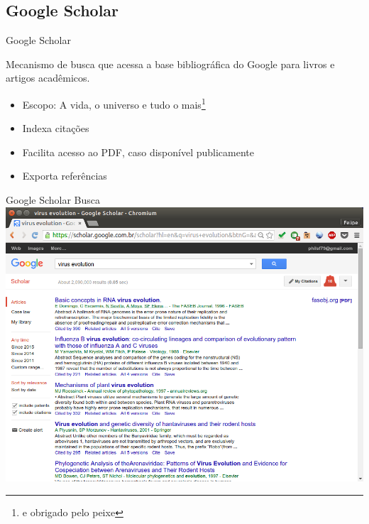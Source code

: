 \documentclass{beamer}
\begin{document}
\subsection{Google Scholar}

\begin{frame}{Google Scholar}
  \begin{definition}
    Mecanismo de busca que acessa a base bibliográfica do Google para
    livros e artigos acadêmicos.
  \end{definition}
  \begin{itemize}
  \item Escopo: A vida, o universo e tudo o mais\footnote{e obrigado
      pelo peixe}
  \item Indexa citações
  \item Facilita acesso ao PDF, caso disponível publicamente
  \item Exporta referências
  \end{itemize}
\end{frame}

\begin{frame}{Google Scholar Busca}
  \includegraphics[height=.85\textheight]{Busca/scholar-busca1}
\end{frame}
\end{document}
